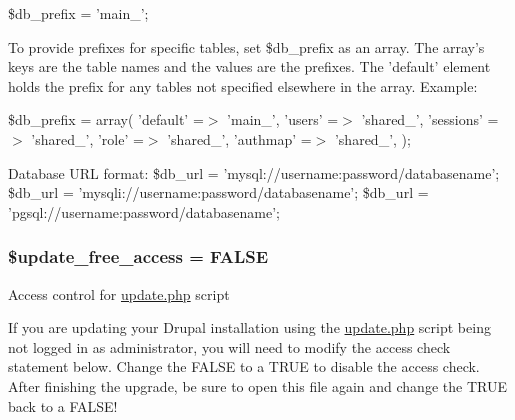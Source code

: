\$db\_\-prefix = 'main\_\-';

To provide prefixes for specific tables, set \$db\_\-prefix as an array. The array's keys are the table names and the values are the prefixes. The 'default' element holds the prefix for any tables not specified elsewhere in the array. Example:

\$db\_\-prefix = array( 'default' =$>$ 'main\_\-', 'users' =$>$ 'shared\_\-', 'sessions' =$>$ 'shared\_\-', 'role' =$>$ 'shared\_\-', 'authmap' =$>$ 'shared\_\-', );

Database URL format: \$db\_\-url = 'mysql://username:password/databasename'; \$db\_\-url = 'mysqli://username:password/databasename'; \$db\_\-url = 'pgsql://username:password/databasename'; \hypertarget{default_8settings_8php_fa06f20a6b90dec9a2573e779cd10b44}{
\subsubsection[{\$update\_\-free\_\-access}]{\setlength{\rightskip}{0pt plus 5cm}\$update\_\-free\_\-access = FALSE}}
\label{default_8settings_8php_fa06f20a6b90dec9a2573e779cd10b44}


Access control for \hyperlink{update_8php}{update.php} script

If you are updating your Drupal installation using the \hyperlink{update_8php}{update.php} script being not logged in as administrator, you will need to modify the access check statement below. Change the FALSE to a TRUE to disable the access check. After finishing the upgrade, be sure to open this file again and change the TRUE back to a FALSE! 